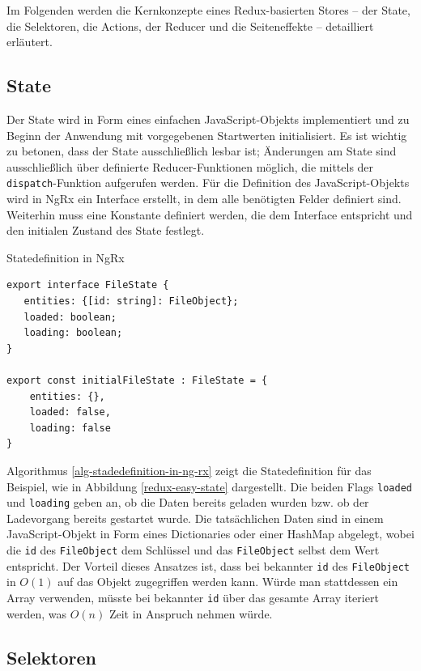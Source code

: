 \documentclass[12pt]{book}          %
\begin{document}
Im Folgenden werden die Kernkonzepte eines Redux-basierten Stores – der State, die Selektoren, die Actions, der Reducer und die Seiteneffekte – detailliert erläutert.

\subsection{State}
\label{subsec-state}

Der State wird in Form eines einfachen JavaScript-Objekts implementiert und zu Beginn der Anwendung mit vorgegebenen Startwerten initialisiert. Es ist wichtig zu betonen, dass der State ausschließlich lesbar ist; Änderungen am State sind ausschließlich über definierte Reducer-Funktionen möglich, die mittels der \texttt{dispatch}-Funktion aufgerufen werden. Für die Definition des JavaScript-Objekts wird in NgRx ein Interface erstellt, in dem alle benötigten Felder definiert sind. Weiterhin muss eine Konstante definiert werden, die dem Interface entspricht und den initialen Zustand des State festlegt.

\begin{algorithm}
\caption{Statedefinition in NgRx}
\label{alg-stadedefinition-in-ng-rx}
\begin{lstlisting}
export interface FileState {
   entities: {[id: string]: FileObject};
   loaded: boolean;
   loading: boolean;
}

export const initialFileState : FileState = {
    entities: {},
    loaded: false,
    loading: false
}
\end{lstlisting}
\end{algorithm}

Algorithmus \ref{alg-stadedefinition-in-ng-rx} zeigt die Statedefinition für das Beispiel, wie in Abbildung \ref{redux-easy-state} dargestellt. Die beiden Flags \texttt{loaded} und \texttt{loading} geben an, ob die Daten bereits geladen wurden bzw. ob der Ladevorgang bereits gestartet wurde. Die tatsächlichen Daten sind in einem JavaScript-Objekt in Form eines Dictionaries oder einer HashMap abgelegt, wobei die \texttt{id} des \texttt{FileObject} dem Schlüssel und das \texttt{FileObject} selbst dem Wert entspricht. Der Vorteil dieses Ansatzes ist, dass bei bekannter \texttt{id} des \texttt{FileObject} in $O(1)$ auf das Objekt zugegriffen werden kann. Würde man stattdessen ein Array verwenden, müsste bei bekannter \texttt{id} über das gesamte Array iteriert werden, was $O(n)$ Zeit in Anspruch nehmen würde. \cite[54]{bae_javascript_2019}

\subsection{Selektoren}
\label{subsec-selektoren}
\end{document}
